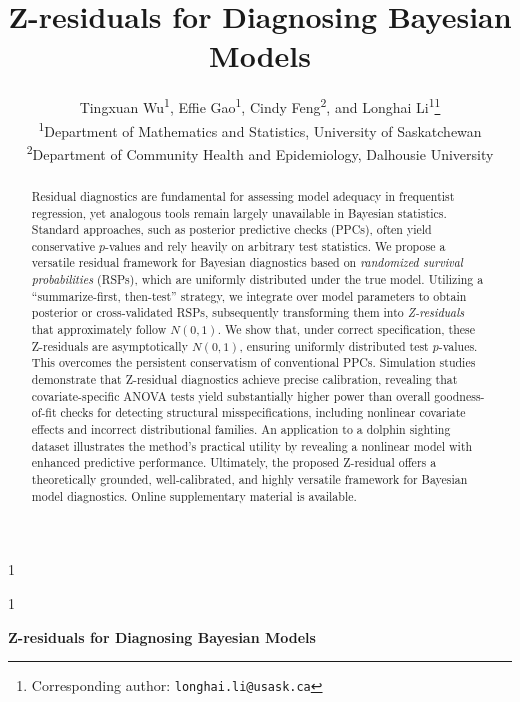\documentclass[
  12pt]{article}
\let\OLDmaketitle\maketitle
\renewcommand{\maketitle}{%
  \begingroup\setstretch{1}\OLDmaketitle\endgroup
}
\providecommand{\anon}{1} %
\begin{document}
\def\spacingset#1{\renewcommand{\baselinestretch}%
{#1}\small\normalsize} \spacingset{1}




\anon
{
  \title{\bf Z-residuals for Diagnosing Bayesian Models}
\author{%
  Tingxuan Wu\textsuperscript{1},
  Effie Gao\textsuperscript{1},
  Cindy Feng\textsuperscript{2},
  and Longhai Li\textsuperscript{1}\thanks{Corresponding author: \texttt{longhai.li@usask.ca}}\\[0.5em]
  \textsuperscript{1}Department of Mathematics and Statistics, University of Saskatchewan\\
  \textsuperscript{2}Department of Community Health and Epidemiology, Dalhousie University
}

\maketitle
} \fi

\anon
{
  \bigskip
  \bigskip
  \begin{center}
    {\LARGE\bf Z-residuals for Diagnosing Bayesian Models}
\end{center}
} \fi

\begin{abstract}

Residual diagnostics are fundamental for assessing model adequacy in frequentist regression, yet analogous tools remain largely unavailable in Bayesian statistics. Standard approaches, such as posterior predictive checks (PPCs), often yield conservative $p$-values and rely heavily on arbitrary test statistics. We propose a versatile residual framework for Bayesian diagnostics based on \emph{randomized survival probabilities} (RSPs), which are uniformly distributed under the true model. Utilizing a ``summarize-first, then-test'' strategy, we integrate over model parameters to obtain posterior or cross-validated RSPs, subsequently transforming them into \emph{Z-residuals} that approximately follow $N(0,1)$. We show that, under correct specification, these Z-residuals are asymptotically $N(0,1)$, ensuring  uniformly distributed test $p$-values. This overcomes the persistent conservatism of conventional PPCs. Simulation studies demonstrate that Z-residual diagnostics achieve precise calibration, revealing that covariate-specific ANOVA tests yield substantially higher power than overall goodness-of-fit checks for detecting structural misspecifications, including nonlinear covariate effects and incorrect distributional families. An application to a dolphin sighting dataset illustrates the method's practical utility by revealing a nonlinear model with enhanced predictive performance. Ultimately, the proposed Z-residual offers a theoretically grounded, well-calibrated, and highly versatile framework for Bayesian model diagnostics. Online supplementary material is available.

\end{abstract}
\end{document}

